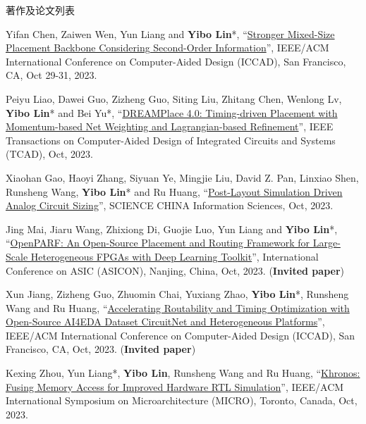 \begin{rSection}{著作及论文列表}
\begin{description}[font=\normalfont, rightmargin=2em]
{}
            

\item[{[C129]}]{
        Yifan Chen, Zaiwen Wen, Yun Liang and \textbf{Yibo Lin}*, 
    ``\href{https://doi.org/10.1109/ICCAD57390.2023.10323700}{Stronger Mixed-Size Placement Backbone Considering Second-Order Information}'', 
    IEEE/ACM International Conference on Computer-Aided Design (ICCAD), San Francisco, CA, Oct 29-31, 2023.
    
}
            

\item[{[J128]}]{
        Peiyu Liao, Dawei Guo, Zizheng Guo, Siting Liu, Zhitang Chen, Wenlong Lv, \textbf{Yibo Lin}* and Bei Yu*, 
    ``\href{https://doi.org/10.1109/TCAD.2023.3240132}{DREAMPlace 4.0: Timing-driven Placement with Momentum-based Net Weighting and Lagrangian-based Refinement}'', 
    IEEE Transactions on Computer-Aided Design of Integrated Circuits and Systems (TCAD), Oct, 2023.
    
}
            

\item[{[J127]}]{
        Xiaohan Gao, Haoyi Zhang, Siyuan Ye, Mingjie Liu, David Z. Pan, Linxiao Shen, Runsheng Wang, \textbf{Yibo Lin}* and Ru Huang, 
    ``\href{https://doi.org/10.1007/s11432-022-3878-5}{Post-Layout Simulation Driven Analog Circuit Sizing}'', 
    SCIENCE CHINA Information Sciences, Oct, 2023.
    
}
            

\item[{[C126]}]{
        Jing Mai, Jiaru Wang, Zhixiong Di, Guojie Luo, Yun Liang and \textbf{Yibo Lin}*, 
    ``\href{https://doi.org/10.1109/ASICON58565.2023.10396248}{OpenPARF: An Open-Source Placement and Routing Framework for Large-Scale Heterogeneous FPGAs with Deep Learning Toolkit}'', 
    International Conference on ASIC (ASICON), Nanjing, China, Oct, 2023.
    (\textbf{Invited paper})
}
            

\item[{[C125]}]{
        Xun Jiang, Zizheng Guo, Zhuomin Chai, Yuxiang Zhao, \textbf{Yibo Lin}*, Runsheng Wang and Ru Huang, 
    ``\href{https://doi.org/10.1109/ICCAD57390.2023.10323938}{Accelerating Routability and Timing Optimization with Open-Source AI4EDA Dataset CircuitNet and Heterogeneous Platforms}'', 
    IEEE/ACM International Conference on Computer-Aided Design (ICCAD), San Francisco, CA, Oct, 2023.
    (\textbf{Invited paper})
}
            

\item[{[C124]}]{
        Kexing Zhou, Yun Liang*, \textbf{Yibo Lin}, Runsheng Wang and Ru Huang, 
    ``\href{https://doi.org/10.1145/3613424.3614301}{Khronos: Fusing Memory Access for Improved Hardware RTL Simulation}'', 
    IEEE/ACM International Symposium on Microarchitecture (MICRO), Toronto, Canada, Oct, 2023.
    
}
\end{description}
\end{rSection}

